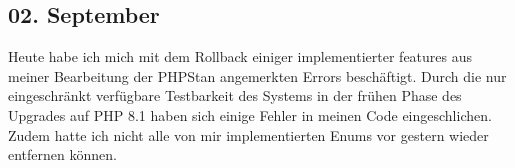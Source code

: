 \subsection{02. September}
Heute habe ich mich mit dem Rollback einiger implementierter features aus meiner Bearbeitung der PHPStan angemerkten Errors beschäftigt. Durch die nur eingeschränkt verfügbare Testbarkeit des Systems in der frühen Phase des Upgrades auf PHP 8.1 haben sich einige Fehler in meinen Code eingeschlichen. Zudem hatte ich nicht alle von mir implementierten Enums vor gestern wieder entfernen können. 